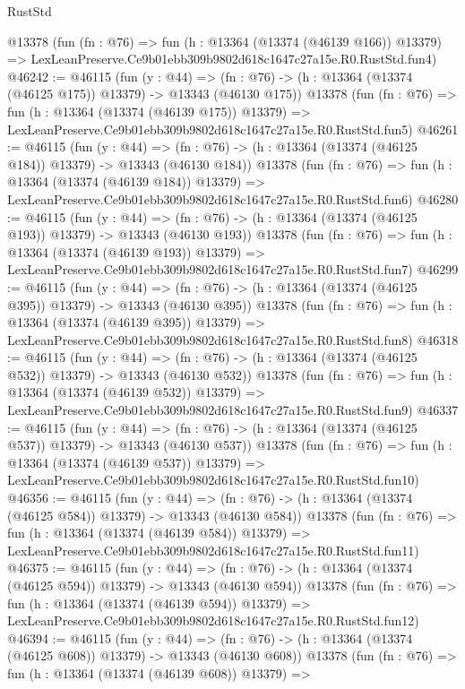 \begin{lexlean}{RustStd}
\begin{coremodule}
    @13378
    (fun (fn : @76) =>
    fun (h : @13364 (@13374 (@46139 @166)) @13379) =>
    LexLeanPreserve.Ce9b01ebb309b9802d618c1647c27a15e.R0.RustStd.fun4)
@46242 := @46115
    (fun (y : @44) =>
    (fn : @76) -> (h : @13364 (@13374 (@46125 @175)) @13379) -> @13343 (@46130 @175))
    @13378
    (fun (fn : @76) =>
    fun (h : @13364 (@13374 (@46139 @175)) @13379) =>
    LexLeanPreserve.Ce9b01ebb309b9802d618c1647c27a15e.R0.RustStd.fun5)
@46261 := @46115
    (fun (y : @44) =>
    (fn : @76) -> (h : @13364 (@13374 (@46125 @184)) @13379) -> @13343 (@46130 @184))
    @13378
    (fun (fn : @76) =>
    fun (h : @13364 (@13374 (@46139 @184)) @13379) =>
    LexLeanPreserve.Ce9b01ebb309b9802d618c1647c27a15e.R0.RustStd.fun6)
@46280 := @46115
    (fun (y : @44) =>
    (fn : @76) -> (h : @13364 (@13374 (@46125 @193)) @13379) -> @13343 (@46130 @193))
    @13378
    (fun (fn : @76) =>
    fun (h : @13364 (@13374 (@46139 @193)) @13379) =>
    LexLeanPreserve.Ce9b01ebb309b9802d618c1647c27a15e.R0.RustStd.fun7)
@46299 := @46115
    (fun (y : @44) =>
    (fn : @76) -> (h : @13364 (@13374 (@46125 @395)) @13379) -> @13343 (@46130 @395))
    @13378
    (fun (fn : @76) =>
    fun (h : @13364 (@13374 (@46139 @395)) @13379) =>
    LexLeanPreserve.Ce9b01ebb309b9802d618c1647c27a15e.R0.RustStd.fun8)
@46318 := @46115
    (fun (y : @44) =>
    (fn : @76) -> (h : @13364 (@13374 (@46125 @532)) @13379) -> @13343 (@46130 @532))
    @13378
    (fun (fn : @76) =>
    fun (h : @13364 (@13374 (@46139 @532)) @13379) =>
    LexLeanPreserve.Ce9b01ebb309b9802d618c1647c27a15e.R0.RustStd.fun9)
@46337 := @46115
    (fun (y : @44) =>
    (fn : @76) -> (h : @13364 (@13374 (@46125 @537)) @13379) -> @13343 (@46130 @537))
    @13378
    (fun (fn : @76) =>
    fun (h : @13364 (@13374 (@46139 @537)) @13379) =>
    LexLeanPreserve.Ce9b01ebb309b9802d618c1647c27a15e.R0.RustStd.fun10)
@46356 := @46115
    (fun (y : @44) =>
    (fn : @76) -> (h : @13364 (@13374 (@46125 @584)) @13379) -> @13343 (@46130 @584))
    @13378
    (fun (fn : @76) =>
    fun (h : @13364 (@13374 (@46139 @584)) @13379) =>
    LexLeanPreserve.Ce9b01ebb309b9802d618c1647c27a15e.R0.RustStd.fun11)
@46375 := @46115
    (fun (y : @44) =>
    (fn : @76) -> (h : @13364 (@13374 (@46125 @594)) @13379) -> @13343 (@46130 @594))
    @13378
    (fun (fn : @76) =>
    fun (h : @13364 (@13374 (@46139 @594)) @13379) =>
    LexLeanPreserve.Ce9b01ebb309b9802d618c1647c27a15e.R0.RustStd.fun12)
@46394 := @46115
    (fun (y : @44) =>
    (fn : @76) -> (h : @13364 (@13374 (@46125 @608)) @13379) -> @13343 (@46130 @608))
    @13378
    (fun (fn : @76) =>
    fun (h : @13364 (@13374 (@46139 @608)) @13379) =>

\end{coremodule}
\end{lexlean}
